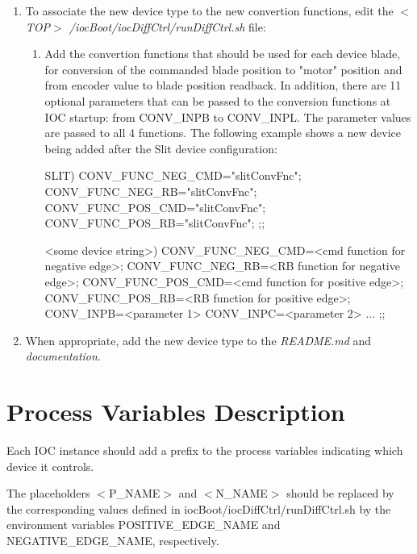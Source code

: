 \documentclass[openany]{article}
\begin{document}
        \begin{enumerate}
            \item To associate the new device type to the new convertion functions, edit the \emph{$<$TOP$>$ /iocBoot/iocDiffCtrl/runDiffCtrl.sh} file:
            \begin{enumerate}
                \item Add the convertion functions that should be used for each device blade, for conversion of the commanded blade position to "motor" position and from encoder value to blade position readback. In addition, there are 11 optional parameters that can be passed to the conversion functions at IOC startup: from CONV\_INPB to CONV\_INPL. The parameter values are passed to all 4 functions. The following example shows a new device being added after the Slit device configuration:
                \vspace{1mm}
                \begin{code}
    SLIT)
        CONV_FUNC_NEG_CMD="slitConvFnc";
        CONV_FUNC_NEG_RB="slitConvFnc";
        CONV_FUNC_POS_CMD="slitConvFnc";
        CONV_FUNC_POS_RB="slitConvFnc";
        ;;

    <some device string>)
        CONV_FUNC_NEG_CMD=<cmd function for negative edge>;
        CONV_FUNC_NEG_RB=<RB function for negative edge>;
        CONV_FUNC_POS_CMD=<cmd function for positive edge>;
        CONV_FUNC_POS_RB=<RB function for positive edge>;
        CONV_INPB=<parameter 1>
        CONV_INPC=<parameter 2>
        ...
        ;;
                \end{code}
                \vspace{1mm}
            \end{enumerate}
            \item When appropriate, add the new device type to the \emph{README.md} and \emph{documentation}.
        \end{enumerate}

\newpage
\section{Process Variables Description}\label{sec:process-variables}

    Each IOC instance should add a prefix to the process variables indicating which device it controls.

    The placeholders $<$P\_NAME$>$ and $<$N\_NAME$>$ should be replaced by the corresponding values defined in iocBoot/iocDiffCtrl/runDiffCtrl.sh by the environment variables POSITIVE\_EDGE\_NAME and NEGATIVE\_EDGE\_NAME, respectively.
\end{document}
